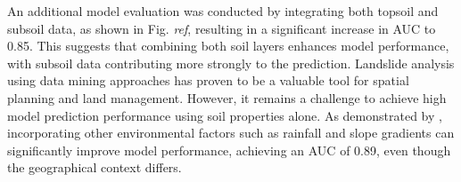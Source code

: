 An additional model evaluation was conducted by integrating both topsoil and subsoil data, as shown in Fig. \textit{ref}, resulting in a significant increase in AUC to 0.85. This suggests that combining both soil layers enhances model performance, with subsoil data contributing more strongly to the prediction. Landslide analysis using data mining approaches has proven to be a valuable tool for spatial planning and land management. However, it remains a challenge to achieve high model prediction performance using soil properties alone. As demonstrated by \cite{disc07}, incorporating other environmental factors such as rainfall and slope gradients can significantly improve model performance, achieving an AUC of 0.89, even though the geographical context differs.

